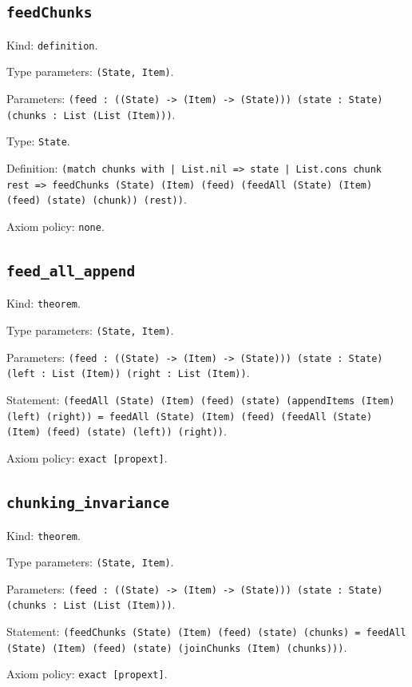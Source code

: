 \documentclass[11pt]{article}
\begin{document}
\subsection*{\texttt{feedChunks}}
\noindent Kind: \texttt{definition}.\par
\noindent Type parameters: \texttt{(State, Item)}.\par
\noindent Parameters: \texttt{(feed : ((State) -> (Item) -> (State))) (state : State) (chunks : List (List (Item)))}.\par
\noindent Type: \texttt{State}.\par
\noindent Definition: \texttt{(match chunks with | List.nil => state | List.cons chunk rest => feedChunks (State) (Item) (feed) (feedAll (State) (Item) (feed) (state) (chunk)) (rest))}.\par
\noindent Axiom policy: \texttt{none}.\par
\subsection*{\texttt{feed\_all\_append}}
\noindent Kind: \texttt{theorem}.\par
\noindent Type parameters: \texttt{(State, Item)}.\par
\noindent Parameters: \texttt{(feed : ((State) -> (Item) -> (State))) (state : State) (left : List (Item)) (right : List (Item))}.\par
\noindent Statement: \texttt{(feedAll (State) (Item) (feed) (state) (appendItems (Item) (left) (right)) = feedAll (State) (Item) (feed) (feedAll (State) (Item) (feed) (state) (left)) (right))}.\par
\noindent Axiom policy: \texttt{exact [propext]}.\par
\subsection*{\texttt{chunking\_invariance}}
\noindent Kind: \texttt{theorem}.\par
\noindent Type parameters: \texttt{(State, Item)}.\par
\noindent Parameters: \texttt{(feed : ((State) -> (Item) -> (State))) (state : State) (chunks : List (List (Item)))}.\par
\noindent Statement: \texttt{(feedChunks (State) (Item) (feed) (state) (chunks) = feedAll (State) (Item) (feed) (state) (joinChunks (Item) (chunks)))}.\par
\noindent Axiom policy: \texttt{exact [propext]}.\par
\end{document}
